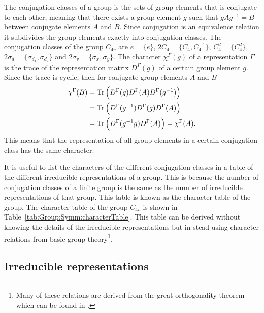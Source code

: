 The conjugation classes of a group is the sets of group elements that is conjugate to each other, meaning that there exists a group element $g$ such
that $gAg^{-1} = B$ between conjugate elements $A$ and $B$. Since conjugation is an equivalence relation it subdivides the group elements
exactly into conjugation classes. The conjugation classes of the group $C_{4v}$ are $e = \{e\}$, $2C_4 = \{C_4,C_4^{-1}\}$, $C_4^2 = \{C_4^2\}$,
$2\sigma_d = \{\sigma_{d_1},\sigma_{d_2}\}$ and $2\sigma_v = \{\sigma_x,\sigma_y\}$. The character $\chi^\Gamma(g)$ of a representation $\Gamma$ is the trace of the representation
matrix $D^\Gamma(g)$ of a certain group element $g$. Since the trace is cyclic, then for conjugate group elements $A$ and $B$
\begin{equation}
    \label{eq:Group:Symm:conjugateCharacter}
    \begin{split}
        \chi^\Gamma(B) &= \operatorname{Tr}\Big(D^\Gamma(g)D^\Gamma(A)D^\Gamma(g^{-1})\Big)\\
        &= \operatorname{Tr}\Big(D^\Gamma(g^{-1})D^\Gamma(g)D^\Gamma(A)\Big)\\
        &= \operatorname{Tr}\Big(D^\Gamma(g^{-1}g)D^\Gamma(A)\Big) = \chi^\Gamma(A).
    \end{split}
\end{equation}
This means that the representation of all group elements in a certain conjugation class has the same character. 

It is useful to list the characters of the different conjugation classes in a table of the different irreducible representations of a group.
This is because the number of conjugation classes of a finite group is the same as the number of irreducible representations of that group.
This table is known as the character table of the group. The character table of
the group $C_{4v}$ is shown in Table~\ref{tab:Group:Symm:characterTable}. This table can be derived without knowing the details of the irreducible
representations but in stead using character relations from basic group theory\footnote{Many of these relations are derived from the great orthogonality
theorem which can be found \eg in \cite{Inui90}.}. 

\subsection{Irreducible representations}

